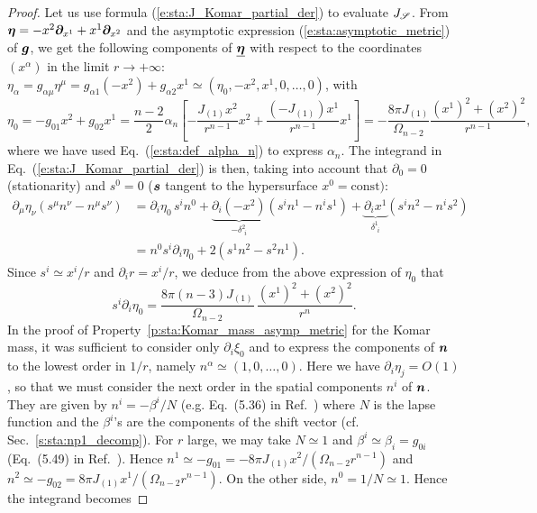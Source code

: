 \begin{proof}
Let us use formula (\ref{e:sta:J_Komar_partial_der}) to evaluate
$J_{\mathscr{S}}$.
From $\bm{\eta} = - x^2 \bm{\partial}_{x^1} + x^1 \bm{\partial}_{x^2}$ and the asymptotic
expression (\ref{e:sta:asymptotic_metric}) of $\bm{g}$, we get the following
components of $\underline{\bm{\eta}}$ with respect to the coordinates $(x^\alpha)$
in the limit $r\to +\infty$:
$\eta_\alpha = g_{\alpha\mu} \eta^\mu = g_{\alpha 1} (-x^2) + g_{\alpha 2} x^1
\simeq (\eta_0, -x^2, x^1, 0, \ldots, 0)$, with
\[
    \eta_0 = - g_{01} x^2 + g_{02} x^1 =
    \frac{n-2}{2} \alpha_n \left[
    - \frac{J_{(1)} x^2}{r^{n-1}} x^2
    + \frac{(-J_{(1)}) x^1}{r^{n-1}} x^1 \right]
    = - \frac{8\pi J_{(1)}}{\Omega_{n-2}} \frac{(x^1)^2 + (x^2)^2}{r^{n-1}} ,
\]
where we have used Eq.~(\ref{e:sta:def_alpha_n}) to express $\alpha_n$.
The integrand in Eq.~(\ref{e:sta:J_Komar_partial_der}) is then, taking into account that $\partial_0 = 0$
(stationarity) and $s^0 = 0$ ($\bm{s}$ tangent to the hypersurface $x^0 = \mathrm{const})$:
\begin{align}
\partial_\mu \eta_\nu (s^\mu n^\nu - n^\mu s^\nu)
  & = \partial_i \eta_0 \, s^i n^0 + \underbrace{\partial_i(-x^2)}_{-\delta^2_{\ \, i}} (s^i n^1 - n^i s^1)
    +  \underbrace{\partial_i x^1}_{\delta^1_{\ \, i}}(s^i n^2 - n^i s^2) \nonumber \\
 & = n^0 s^i \partial_i \eta_0  + 2 (s^1 n^2 - s^2 n^1) . \nonumber
\end{align}
Since $s^i \simeq x^i / r$ and $\partial_i r = x^i / r$,
we deduce from the above expression of $\eta_0$ that
\[
    s^i \partial_i \eta_0 = \frac{8\pi (n-3) J_{(1)}}{\Omega_{n-2}} \, \frac{(x^1)^2 + (x^2)^2}{r^n} .
\]
In the proof of Property~\ref{p:sta:Komar_mass_asymp_metric} for the Komar mass,
it was sufficient to consider only
$\partial_i\xi_0$ and to express the components of $\bm{n}$ to the lowest order in
$1/r$, namely $n^\alpha \simeq (1,0,\ldots,0)$. Here we have $\partial_i \eta_j = O(1)$,
so that we must consider the next order in the spatial components $n^i$ of
$\bm{n}$. They are given by $n^i = -\beta^i/N$ (e.g. Eq.~(5.36) in Ref.~\cite{Gourg12}) where $N$ is the lapse function and the $\beta^i$'s are the components of the shift vector
(cf. Sec.~\ref{s:sta:np1_decomp}).
For $r$ large, we may take $N\simeq 1$ and
$\beta^i \simeq \beta_i = g_{0i}$ (Eq.~(5.49) in Ref.~\cite{Gourg12}).
Hence $n^1 \simeq - g_{01} = - 8\pi J_{(1)} x^2 / (\Omega_{n-2} r^{n-1})$
and $n^2 \simeq - g_{02} = 8\pi J_{(1)} x^1 / (\Omega_{n-2} r^{n-1})$.
On the other side, $n^0 = 1/N \simeq 1$. Hence
the integrand becomes

\end{proof}

